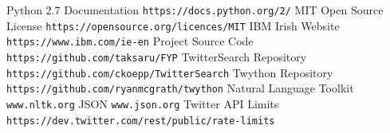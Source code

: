 \documentclass[12pt,a4paper]{report}
\begin{document}
\begin{thebibliography}{8}
Python 2.7 Documentation
\texttt{https://docs.python.org/2/}
MIT Open Source License
\texttt{https://opensource.org/licences/MIT}
IBM Irish Website
\texttt{https://www.ibm.com/ie-en}
Project Source Code
\texttt{https://github.com/taksaru/FYP}
TwitterSearch Repository
\texttt{https://github.com/ckoepp/TwitterSearch}
Twython Repository
\texttt{https://github.com/ryanmcgrath/twython}
Natural Language Toolkit
\texttt{www.nltk.org}
JSON 
\texttt{www.json.org}
Twitter API Limits
\texttt{https://dev.twitter.com/rest/public/rate-limits}
\end{thebibliography}
\end{document}
